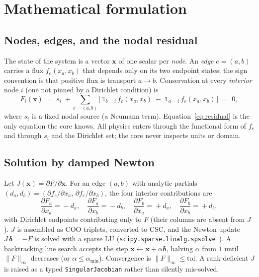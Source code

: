 \documentclass[11pt]{article}
\begin{document}
\section{Mathematical formulation}\label{sec:form}

\subsection{Nodes, edges, and the nodal residual}
The state of the system is a vector $\mathbf{x}$ of one scalar per
\emph{node}. An \emph{edge} $e=(a,b)$ carries a flux $f_e(x_a,x_b)$ that
depends only on its two endpoint states; the sign convention is that positive
flux is transport $a\!\to\!b$. Conservation at every \emph{interior} node $i$
(one not pinned by a Dirichlet condition) is
\begin{equation}
F_i(\mathbf{x}) \;=\; s_i \;+\!\!\sum_{e=(a,b)}\!\!
\Big[\,\mathbb{1}_{b=i}\,f_e(x_a,x_b)\;-\;\mathbb{1}_{a=i}\,f_e(x_a,x_b)\,\Big]
\;=\;0 ,
\label{eq:residual}
\end{equation}
where $s_i$ is a fixed nodal source (a Neumann term). Equation~\eqref{eq:residual}
is the only equation the core knows. All physics enters through the functional
form of $f_e$ and through $s_i$ and the Dirichlet set; the core never inspects
units or domain.

\subsection{Solution by damped Newton}
Let $J(\mathbf{x}) = \partial F/\partial \mathbf{x}$. For an edge $(a,b)$ with
analytic partials $(d_a,d_b)=(\partial f_e/\partial x_a,\,\partial f_e/\partial
x_b)$, the four interior contributions are
\begin{equation}
\frac{\partial F_a}{\partial x_a}\!=\!-d_a,\quad
\frac{\partial F_a}{\partial x_b}\!=\!-d_b,\quad
\frac{\partial F_b}{\partial x_a}\!=\!+d_a,\quad
\frac{\partial F_b}{\partial x_b}\!=\!+d_b,
\end{equation}
with Dirichlet endpoints contributing only to $F$ (their columns are absent from
$J$). $J$ is assembled as COO triplets, converted to CSC, and the Newton update
$J\,\boldsymbol{\delta} = -F$ is solved with a sparse LU
(\texttt{scipy.sparse.linalg.spsolve}~\cite{scipy}). A backtracking line search
accepts the step $\mathbf{x}\!\leftarrow\!\mathbf{x}+\alpha\boldsymbol{\delta}$,
halving $\alpha$ from $1$ until $\lVert F\rVert_\infty$ decreases (or
$\alpha\le\alpha_{\min}$). Convergence is $\lVert F\rVert_\infty \le
\text{tol}$. A rank-deficient $J$ is raised as a typed
\texttt{SingularJacobian} rather than silently mis-solved.
\end{document}
